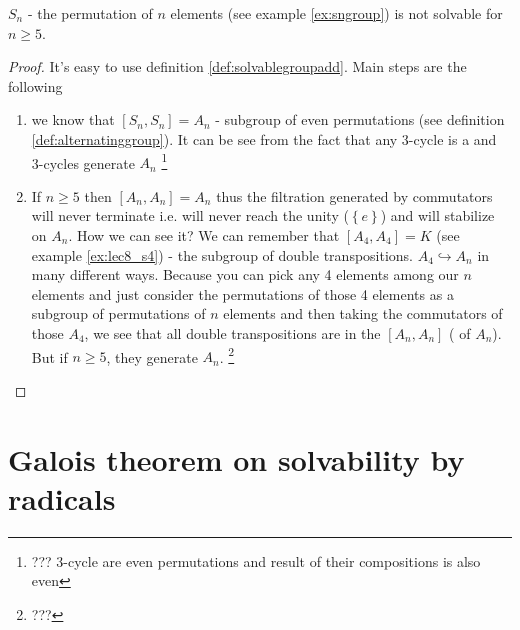 \begin{theorem}[$S_n$ solvability]
  $S_n$ - the permutation of $n$ elements (see example
  \ref{ex:sngroup}) is not solvable for $n \ge 5$. 
  \begin{proof}
    It's easy to use definition \ref{def:solvablegroupadd}.
    Main steps are the following
    \begin{enumerate}
      \item we know that $\left[S_n, S_n\right] = A_n$ - subgroup of
        even permutations (see definition
        \ref{def:alternatinggroup}). It can be see from the fact that
        any 3-cycle is a  and 3-cycles
        generate $A_n$
        \footnote{
          ??? 3-cycle are even permutations and result of
          their compositions is also even
        }
      \item If $n \ge 5$ then $\left[A_n, A_n\right] = A_n$ thus the
        filtration generated by commutators will never terminate
        i.e. will never reach the unity ($\left\{e\right\}$) and will
        stabilize on $A_n$. How we can see it? We can remember that
        $\left[A_4, A_4\right] = K$ (see example \ref{ex:lec8_s4}) -
        the subgroup of double transpositions. $A_4 \hookrightarrow
        A_n$ in many different ways. Because you can pick any 4
        elements among our $n$ elements and just consider the
        permutations of 
        those 4 elements as a subgroup of permutations of $n$
        elements and then taking the commutators of those $A_4$, we
        see that all double transpositions are in the $\left[A_n,
          A_n\right]$ ( of $A_n$). But
        if $n \ge 5$, they generate $A_n$.
        \footnote{
          ???
        }
    \end{enumerate}
  \end{proof}
  \label{thm:lec8_sn_solvability}
\end{theorem}

\section{Galois theorem on solvability by radicals}

